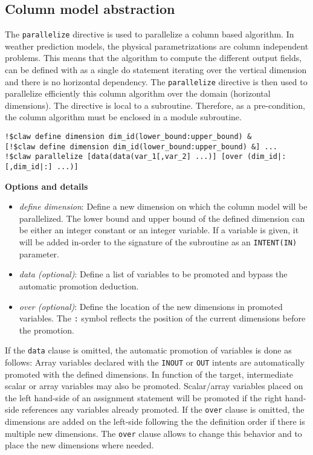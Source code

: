 \subsection{Column model abstraction}

The \lstinline!parallelize! directive is used to parallelize a column based
algorithm. In weather prediction models, the physical parametrizations are column
independent problems. This means that the algorithm to compute the different
output fields, can be defined with as a single do statement iterating over the vertical dimension and there is no horizontal dependency.
The \lstinline!parallelize! directive is then used to parallelize efficiently this 
column algorithm over the domain (horizontal 
dimensions).
The directive is local to a subroutine. Therefore, as a pre-condition, the column algorithm 
must be enclosed in a module subroutine.

\begin{lstlisting}
!$claw define dimension dim_id(lower_bound:upper_bound) &
[!$claw define dimension dim_id(lower_bound:upper_bound) &] ...
!$claw parallelize [data(data(var_1[,var_2] ...)] [over (dim_id|:[,dim_id|:] ...)]
\end{lstlisting}

\textbf{Options and details}
\begin{itemize}
\item \textit{define dimension}: Define a new dimension on which the column
model will be parallelized. The lower bound and upper bound of the defined
dimension can be either an integer constant or an integer variable. If a
variable is given, it will be added in-order to the signature of the subroutine
as an \lstinline!INTENT(IN)! parameter.
\item \textit{data (optional)}: Define a list of variables to be promoted and 
bypass the automatic promotion deduction.
\item \textit{over (optional)}: Define the location of the new dimensions in promoted variables. The \lstinline!:! symbol reflects the position 
of the current dimensions before the promotion.
\end{itemize}

If the \lstinline!data! clause is omitted, the automatic promotion of variables 
is done as follows:
Array variables declared with the \lstinline!INOUT! or \lstinline!OUT! intents
are automatically promoted with the defined dimensions.
In function of the target, intermediate scalar or array variables may also be 
promoted.
Scalar/array variables placed on the left hand-side of an assignment statement 
will be promoted if the right hand-side references any variables already promoted.
If the \lstinline!over! clause is omitted, the dimensions are
added on the left-side following the the definition order if there is multiple new dimensions. The \lstinline!over! clause allows to change this behavior and to place 
the new dimensions where needed.

